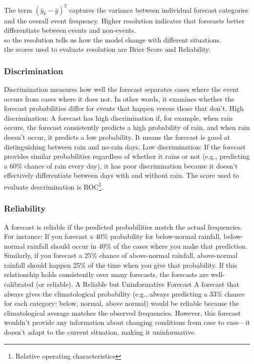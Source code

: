 The term $\left( \bar{y}_k - \bar{y} \right)^2$ captures the variance between individual forecast categories and the overall event frequency. Higher resolution indicates that forecasts better differentiate between events and non-events.\\
so the resolution tells us how the model change with different situations.\\
the scores used to evaluate resolution are Brier Score and Reliability.



		\subsubsection{Discrimination}

Discrimination measures how well the forecast separates cases where the event occurs from cases where it does not. In other words, it examines whether the forecast probabilities differ for events that happen versus those that don't.
High discrimination: A forecast has high discrimination if, for example, when rain occurs, the forecast consistently predicts a high probability of rain, and when rain doesn’t occur, it predicts a low probability. It means the forecast is good at distinguishing between rain and no-rain days.
Low discrimination: If the forecast provides similar probabilities regardless of whether it rains or not (e.g., predicting a 60\% chance of rain every day), it has poor discrimination because it doesn’t effectively differentiate between days with and without rain. The score used to evaluate descrimination is ROC\footnote{Relative operating characteristics}.
		\subsubsection{Reliability}

A forecast is reliable if the predicted probabilities match the actual frequencies. For instance:
If you forecast a 40\% probability for below-normal rainfall, below-normal rainfall should occur in 40\% of the cases where you make that prediction.
Similarly, if you forecast a 25\% chance of above-normal rainfall, above-normal rainfall should happen 25\% of the time when you give that probability.
If this relationship holds consistently over many forecasts, the forecasts are well-calibrated (or reliable).
A Reliable but Uninformative Forecast
A forecast that always gives the climatological probability (e.g., always predicting a 33\% chance for each category: below, normal, above normal) would be reliable because the climatological average matches the observed frequencies. However, this forecast wouldn’t provide any information about changing conditions from case to case—it doesn’t adapt to the current situation, making it uninformative.


